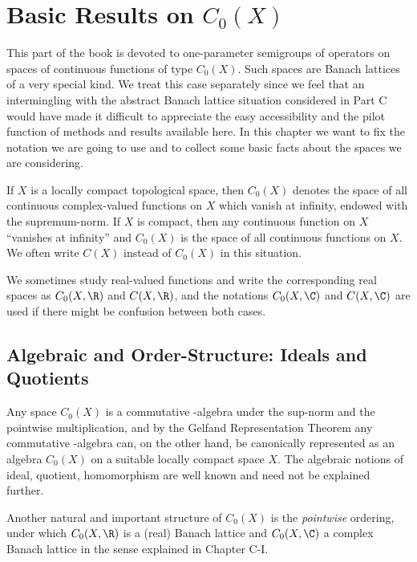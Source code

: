 
\chapter{Basic Results on $C_{0}(X)$}\label{chap:B-I}


This part of the book is devoted to one-parameter semigroups of operators on spaces of continuous functions of type $C_{0}(X)$.
Such spaces are Banach lattices of a very special kind.
We treat this case separately since we feel that an intermingling with the abstract Banach lattice situation considered in Part C would have made it difficult to appreciate the easy accessibility and the pilot function of methods and results available here.
In this chapter we want to fix the notation we are going to use and to collect some basic facts about the spaces we are considering.

If $X$ is a locally compact topological space, then $C_{0}(X)$ denotes the space of all continuous complex-valued functions on $X$ which vanish at infinity, endowed with the supremum-norm.
If $X$ is compact, then any continuous function on $X$ \enquote{vanishes at infinity} and $C_{0}(X)$ is the space of all continuous functions on $X$.
We often write $C(X)$ instead of $C_{0}(X)$ in this situation.

We sometimes study real-valued functions and write the corresponding real spaces as $C_{0}(X,\R)$ and 
$C(X,\R)$, and the notations $C_{0}(X,\C)$ and $C(X,\C)$ are used if there might be confusion between both cases.

\section{Algebraic and Order-Structure: Ideals and Quotients}\label{sec:b1-1}

Any space $C_{0}(X)$ is a commutative \CA-algebra under the sup-norm and the pointwise multiplication, and by the Gelfand Representation Theorem any commutative \CA-algebra can, on the other hand, be canonically represented as an algebra $C_{0}(X)$ on a suitable locally compact space $X$.
The algebraic notions of ideal, quotient, homomorphism are well known and need not be explained further.

Another natural and important structure of $C_{0}(X)$ is the \emph{pointwise} ordering, under which $C_{0}(X,\R)$ is a (real) Banach lattice and $C_{0}(X,\C)$ a complex Banach lattice in the sense explained in Chapter C-I.

